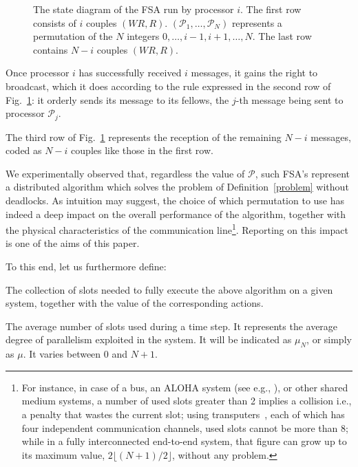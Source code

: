 \documentclass{elsart}
\newcommand{\floor}[1]{{\lfloor{#1}\rfloor}}
\begin{document}
\begin{figure}
\centerline{}
\caption{The state diagram of the FSA run by processor $i$. The first
row consists of $i$ couples \( (W\!R, R) \).
$({\mathcal P}_1,\dots,{\mathcal P}_N)$ represents a permutation of the $N$ integers
$0,\dots,i-1,i+1,\dots,N$.
The last row contains $N-i$ couples \( (W\!R, R) \).
}\label{fsa}
\end{figure}

Once processor $i$ has successfully received $i$ messages, it gains 
the right to broadcast, which it does according to the rule expressed in 
the second row of Fig.~\ref{fsa}: it orderly sends its message to
its fellows, the $j$-th message being sent to processor ${\mathcal P}_j$.

The third row of Fig.~\ref{fsa} represents the reception of the remaining $N-i$ messages, 
coded as $N-i$ couples like those in the first row.

We experimentally observed that, regardless the value of $\mathcal P$, such FSA's
represent a distributed algorithm which solves the problem of
Definition~\ref{problem} without deadlocks.
As intuition may suggest, the choice of which permutation to use has
indeed a deep impact
on the overall performance of the algorithm, together
with the physical characteristics of the communication 
line\footnote{For instance, in case of a bus, 
	      an ALOHA system (see e.g., \cite{Tan96}), or
	      other shared medium systems,
              a number of used slots greater than 2 implies a collision 
              i.e., a penalty that wastes the current slot; using
	      transputers~\cite{Gra90}, each of which has
	      four independent communication channels,
              used slots cannot be more than 8; while in a 
              fully interconnected end-to-end system, that figure
              can grow up to its maximum value, $2\floor{(N+1)/2}$, 
	      without any problem.}.
Reporting on this impact is one of the aims of this paper. 

To this end, let us furthermore define:

\begin{defn}[run]
The collection of slots needed to fully execute the above algorithm on a 
given system, together with the value of the corresponding actions.
\end{defn}

\begin{defn}
The average number of slots used during a time step. It represents
the average degree of parallelism exploited in the system.
It will be indicated as $\mu_N$, or simply as $\mu$. It varies between 0
and $N+1$.
\end{defn}
\end{document}
